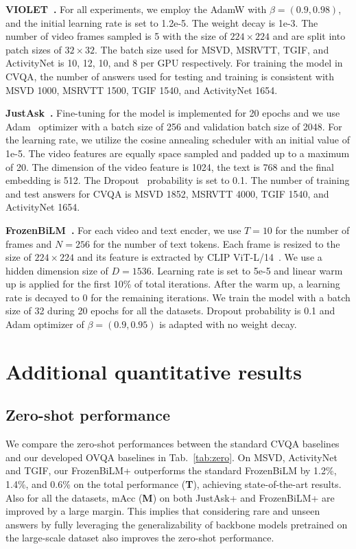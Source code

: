 \documentclass[10pt,twocolumn,letterpaper]{article}
\begin{document}
\noindent \textbf{VIOLET~\cite{fu2021violet}.}
 For all experiments, we employ the AdamW with $\beta=(0.9, 0.98)$, and the initial learning rate is set to 1.2e-5. 
 The weight decay is 1e-3. 
 The number of video frames sampled is 5 with the size of $224 \times 224$ and are split into patch sizes of $32 \times 32$. 
 The batch size used for MSVD, MSRVTT, TGIF, and ActivityNet is 10, 12, 10, and 8 per GPU respectively. 
 For training the model in CVQA, the number of answers used for testing and training is consistent with MSVD 1000, MSRVTT 1500, TGIF 1540, and ActivityNet 1654.
 
\noindent \textbf{JustAsk~\cite{yang2021just}.}
Fine-tuning for the model is implemented for 20 epochs and we use Adam~\cite{kingma2014adam} optimizer with a batch size of 256 and validation batch size of 2048. 
For the learning rate, we utilize the cosine annealing scheduler with an initial value of 1e-5. 
The video features are equally space sampled and padded up to a maximum of 20. 
The dimension of the video feature is 1024, the text is 768 and the final embedding is 512. 
The Dropout~\cite{srivastava2014dropout} probability is set to 0.1. 
The number of training and test answers for CVQA is MSVD 1852, MSRVTT 4000, TGIF 1540, and ActivityNet 1654. 

\noindent \textbf{FrozenBiLM~\cite{yang2022zero}.}
For each video and text encder, we use $T = 10$ for the number of frames and $N = 256$ for the number of text tokens.
Each frame is resized to the size of $224 \times 224$ and its feature is extracted by CLIP ViT-L/14~\cite{radford2021learning,dosovitskiy2020image}.
We use a hidden dimension size of $D = 1536$.
Learning rate is set to 5e-5 and linear warm up is applied for the first 10\% of total iterations.
After the warm up, a learning rate is decayed to 0 for the remaining iterations.
We train the model with a batch size of 32 during 20 epochs for all the datasets.
Dropout probability is 0.1 and Adam optimizer of $\beta=(0.9, 0.95)$ is adapted with no weight decay. \section{Additional quantitative results}

\subsection{Zero-shot performance}
We compare the zero-shot performances between the standard CVQA baselines and our developed OVQA baselines in Tab.~\ref{tab:zero}.
On MSVD, ActivityNet and TGIF, our FrozenBiLM+ outperforms the standard FrozenBiLM by 1.2\%, 1.4\%, and 0.6\% on the total performance (\textbf{T}), achieving state-of-the-art results.
Also for all the datasets, mAcc (\textbf{M}) on both JustAsk+ and FrozenBiLM+ are improved by a large margin.
This implies that considering rare and unseen answers by fully leveraging the generalizability of backbone models pretrained on the large-scale dataset also improves the zero-shot performance.
\end{document}
